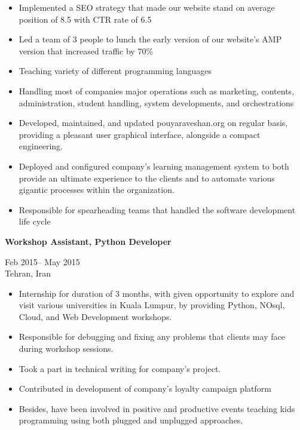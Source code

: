 \documentclass[10pt,a4paper,ragged2e,withhyper]{altacv}
\renewcommand{\cvevent}[4]{%
  \textbf{#1} %
  \hfill %
  \begin{minipage}[t]{.5\linewidth}
    \raggedleft %
    \small#3 %
    \\ %
    #4 %
  \end{minipage}
  \vspace{\baselineskip} %
}
\begin{document}
\begin{itemize}

  \item   Implemented a SEO strategy that made our website stand on average position of 8.5 with CTR rate of 6.5
  \item Led a team of 3 people to lunch the early version of our website’s AMP version that increased traffic by 70\% 
  \item Teaching variety of different programming languages
  \item Handling most of companies major operations such as marketing, contents, administration, student handling, system developments, and orchestrations
  \item Developed, maintained, and updated pouyaraveshan.org on regular basis, providing a pleasant user graphical interface, alongside a compact engineering.
  \item  Deployed and configured company's learning management system to both provide an ultimate experience to the clients and to automate various gigantic processes within the organization.
  \item Responsible for spearheading teams that handled the software development life cycle 
\end{itemize}

\divider

\vspace{0.5cm}

\cvevent{Workshop Assistant, Python Developer }{Cake Creative Digital Lab}{Feb 2015-- May 2015}{Tehran, Iran}


\begin{itemize}

  \item Internship for duration of 3 months, with given opportunity to explore and visit various universities in Kuala Lumpur, by providing Python, NOsql, Cloud, and Web Development workshops.
  \item Responsible for debugging and fixing any problems that clients may face during workshop sessions.
  \item Took a part in technical writing for company's project. 
  \item Contributed in development of company's loyalty campaign platform 
  \item Besides, have been involved in positive and productive events teaching kids programming using both plugged and unplugged approaches.
\end{itemize}
\end{document}
